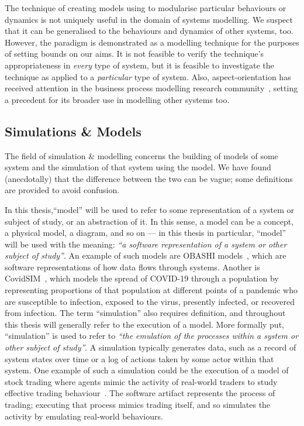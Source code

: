 The technique of creating models using \aspectorientation to modularise
particular behaviours or dynamics is not uniquely useful in the domain of
\sociotechnical systems modelling.
We suspect that it can be generalised to the behaviours and dynamics
of other systems, too. However, the paradigm is
demonstrated as a \sociotechnical modelling technique for the purposes of
setting bounds on our aims. It is not feasible to verify the
technique's appropriateness in \emph{every} type of system, but it is feasible to
investigate the technique as applied to a \emph{particular} type of system.
Also, aspect-orientation has received attention in the business process
modelling research
community~\cite{charfi2007ao4bpel,Cappelli_AOBPM,Charfi2006AspectOrientedWL},
setting a precedent for its broader use in modelling other \sociotechnical
systems too.


\subsection{Simulations \& Models}
\label{intro_defining_simulation_and_model}

The field of simulation \& modelling concerns the building of models of some
system and the simulation of that system using the model. We have found
(anecdotally) that the difference between the two can be vague; some definitions
are provided to avoid confusion.

In this thesis,``model'' will be used to refer to some representation of a
system or subject of study, or an abstraction of it. In this sense, a model can
be a concept, a physical model, a diagram, and so on --- in this thesis in
particular, ``model'' will be used with the meaning: \emph{``a software
representation of a system or other subject of study''}. An example of such
models are OBASHI models~\cite{obashimethodology}, which are software
representations of how data flows through \sociotechnical systems. Another is
CovidSIM~\cite{covidsim_tool}, which models the spread of COVID-19 through a
population by representing proportions of that population at different points of
a pandemic who are susceptible to infection, exposed to the virus, presently
infected, or recovered from infection.
The term
``simulation'' also requires definition, and throughout this thesis will
generally refer to the execution of a model. More formally put, ``simulation''
is used to refer to \emph{``the emulation of the processes within a system or
  other subject of study''}. A simulation typically generates data, such as a
record of system states over time or a log of actions taken by some actor within
that system. One example of such a simulation could be the execution of a model
of stock trading where agents mimic the activity of real-world traders to study
effective trading behaviour~\cite{ZipTradersCliff}. The software artifact
represents the process of trading; executing that process mimics trading itself,
and so simulates the activity by emulating real-world behaviours.


